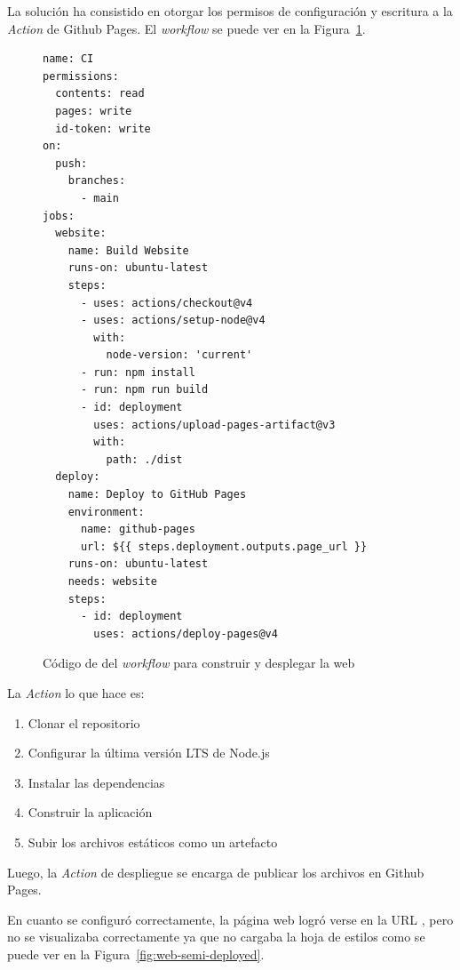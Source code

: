 \documentclass{article}
\begin{document}
La solución ha consistido en otorgar los permisos de configuración y escritura a la \textit{Action} de Github Pages. El \textit{workflow} se puede ver en la Figura~\ref{fig:workflow}.

\begin{figure}[h!]
\begin{verbatim}
name: CI
permissions:
  contents: read
  pages: write
  id-token: write
on:
  push:
    branches:
      - main
jobs:
  website:
    name: Build Website
    runs-on: ubuntu-latest
    steps:
      - uses: actions/checkout@v4
      - uses: actions/setup-node@v4
        with:
          node-version: 'current'
      - run: npm install
      - run: npm run build
      - id: deployment
        uses: actions/upload-pages-artifact@v3
        with:
          path: ./dist
  deploy:
    name: Deploy to GitHub Pages
    environment:
      name: github-pages
      url: ${{ steps.deployment.outputs.page_url }}
    runs-on: ubuntu-latest
    needs: website
    steps:
      - id: deployment
        uses: actions/deploy-pages@v4
\end{verbatim}
\caption{Código de del \textit{workflow} para construir y desplegar la web}
\label{fig:workflow}
\end{figure}

La \textit{Action} lo que hace es:

\begin{enumerate}
    \item Clonar el repositorio
    \item Configurar la última versión LTS de Node.js
    \item Instalar las dependencias
    \item Construir la aplicación
    \item Subir los archivos estáticos como un artefacto
\end{enumerate}

Luego, la \textit{Action} de despliegue se encarga de publicar los archivos en Github Pages.

En cuanto se configuró correctamente, la página web logró verse en la URL \href{https://www.danielramos.me/hhyc-dramosac}, pero no se visualizaba correctamente ya que no cargaba la hoja de estilos como se puede ver en la Figura~\ref{fig:web-semi-deployed}.
\end{document}
